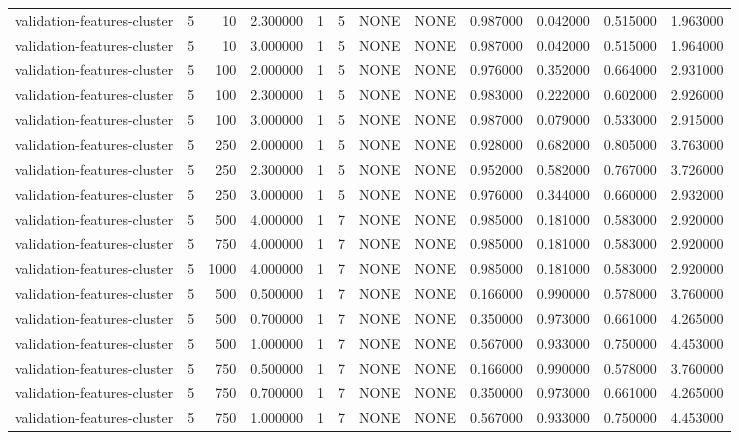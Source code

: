 \begin{tabular}{lrrrllllrrrr}
validation-features-cluster & 5 & 10 & 2.300000 & 1 & 5 & NONE & NONE & 0.987000 & 0.042000 & 0.515000 & 1.963000 \\
validation-features-cluster & 5 & 10 & 3.000000 & 1 & 5 & NONE & NONE & 0.987000 & 0.042000 & 0.515000 & 1.964000 \\
validation-features-cluster & 5 & 100 & 2.000000 & 1 & 5 & NONE & NONE & 0.976000 & 0.352000 & 0.664000 & 2.931000 \\
validation-features-cluster & 5 & 100 & 2.300000 & 1 & 5 & NONE & NONE & 0.983000 & 0.222000 & 0.602000 & 2.926000 \\
validation-features-cluster & 5 & 100 & 3.000000 & 1 & 5 & NONE & NONE & 0.987000 & 0.079000 & 0.533000 & 2.915000 \\
validation-features-cluster & 5 & 250 & 2.000000 & 1 & 5 & NONE & NONE & 0.928000 & 0.682000 & 0.805000 & 3.763000 \\
validation-features-cluster & 5 & 250 & 2.300000 & 1 & 5 & NONE & NONE & 0.952000 & 0.582000 & 0.767000 & 3.726000 \\
validation-features-cluster & 5 & 250 & 3.000000 & 1 & 5 & NONE & NONE & 0.976000 & 0.344000 & 0.660000 & 2.932000 \\
validation-features-cluster & 5 & 500 & 4.000000 & 1 & 7 & NONE & NONE & 0.985000 & 0.181000 & 0.583000 & 2.920000 \\
validation-features-cluster & 5 & 750 & 4.000000 & 1 & 7 & NONE & NONE & 0.985000 & 0.181000 & 0.583000 & 2.920000 \\
validation-features-cluster & 5 & 1000 & 4.000000 & 1 & 7 & NONE & NONE & 0.985000 & 0.181000 & 0.583000 & 2.920000 \\
validation-features-cluster & 5 & 500 & 0.500000 & 1 & 7 & NONE & NONE & 0.166000 & 0.990000 & 0.578000 & 3.760000 \\
validation-features-cluster & 5 & 500 & 0.700000 & 1 & 7 & NONE & NONE & 0.350000 & 0.973000 & 0.661000 & 4.265000 \\
validation-features-cluster & 5 & 500 & 1.000000 & 1 & 7 & NONE & NONE & 0.567000 & 0.933000 & 0.750000 & 4.453000 \\
validation-features-cluster & 5 & 750 & 0.500000 & 1 & 7 & NONE & NONE & 0.166000 & 0.990000 & 0.578000 & 3.760000 \\
validation-features-cluster & 5 & 750 & 0.700000 & 1 & 7 & NONE & NONE & 0.350000 & 0.973000 & 0.661000 & 4.265000 \\
validation-features-cluster & 5 & 750 & 1.000000 & 1 & 7 & NONE & NONE & 0.567000 & 0.933000 & 0.750000 & 4.453000 \\

\end{tabular}
